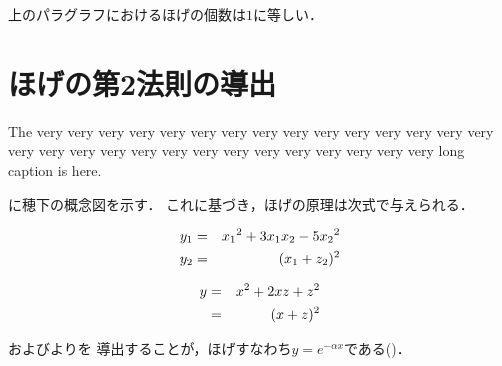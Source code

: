 \begin{small}
上のパラグラフにおけるほげの個数は$1$に等しい．


\section{ほげの第2法則の導出}


{\baselineskip=9pt The very very very very very very very very very very very very very
very very very very very very very very very very very very very very
very very long caption is here.}

に穂下の概念図を示す．
これに基づき，ほげの原理は次式で与えられる\cite{hooogeBook}．

\begin{eqnarray}
\equlabel{hoge1}
y_1 & = & {x_1}^2 + 3x_1x_2 - 5{x_2}^2 \\
\equlabel{hoge2}
y_2 & = & (x_1 + z_2)^2
\end{eqnarray}

\begin{eqnarray}
\equlabel{hoge3}
y & = & x^2 + 2xz + z^2 \nonumber\\
  & = & (x + z)^2
\end{eqnarray}


およびよりを
導出することが，ほげすなわち$y=e^{-\alpha x}$である()．








{


}

\end{small}

